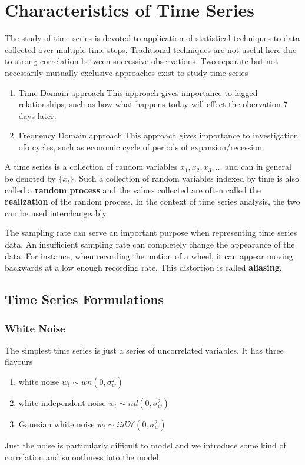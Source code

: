 \documentclass[../main.tex]{subfiles}
\begin{document}
    \section{Characteristics of Time Series}
    The study of time series is devoted to application of statistical techniques to data collected over multiple time steps. Traditional techniques are not useful here due to strong correlation between successive observations.\newline
    Two separate but not necessarily mutually exclusive approaches exist to study time series
    \begin{enumerate}
        \item Time Domain approach
        This approach gives importance to lagged relationships, such as how what happens today will effect the obervation 7 days later.
        \item Frequency Domain approach
        This approach gives importance to investigation ofo cycles, such as economic cycle of periods of expansion/recession.
    \end{enumerate}

    A time series is a collection of random variables $x_{1}, x_{2}, x_{3}, \ldots$ and can in general be denoted by $\{x_{t}\}$. Such a collection of random variables indexed by time is also called a \textbf{random process} and the values collected are often called the \textbf{realization} of the random process. In the context of time series analysis, the two can be used interchangeably.\newline

    The sampling rate can serve an important purpose when representing time series data. An insufficient sampling rate can completely change the appearance of the data. For instance, when recording the motion of a wheel, it can appear moving backwards at a low enough recording rate. This distortion is called \textbf{aliasing}.

    \subsection{Time Series Formulations}
    \subsubsection{White Noise}
    The simplest time series is just a series of uncorrelated variables. It has three flavours
    \begin{enumerate}
        \item white noise $w_{t} \sim wn(0, \sigma_{w}^{2})$
        \item white independent noise $w_{t} \sim iid(0, \sigma_{w}^{2})$
        \item Gaussian white noise $w_{t} \sim iid \mathcal{N}(0, \sigma_{w}^{2})$
    \end{enumerate}
    Just the noise is particularly difficult to model and we introduce some kind of correlation and smoothness into the model.
\end{document}
